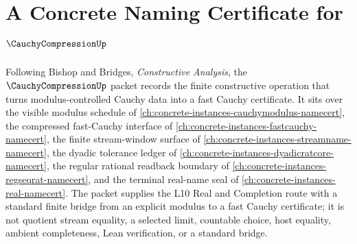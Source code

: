 \chapter{A Concrete Naming Certificate for $\CauchyCompressionUp$}
\label{ch:concrete-instances-cauchy-compression-namecert}

Following Bishop and Bridges, \emph{Constructive Analysis}, the $\CauchyCompressionUp$ packet records the finite constructive operation that turns modulus-controlled Cauchy data into a fast Cauchy certificate. It sits over the visible modulus schedule of \autoref{ch:concrete-instances-cauchymodulus-namecert}, the compressed fast-Cauchy interface of \autoref{ch:concrete-instances-fastcauchy-namecert}, the finite stream-window surface of \autoref{ch:concrete-instances-streamname-namecert}, the dyadic tolerance ledger of \autoref{ch:concrete-instances-dyadicratcore-namecert}, the regular rational readback boundary of \autoref{ch:concrete-instances-regseqrat-namecert}, and the terminal real-name seal of \autoref{ch:concrete-instances-real-namecert}. The packet supplies the L10 Real and Completion route with a standard finite bridge from an explicit modulus to a fast Cauchy certificate; it is not quotient stream equality, a selected limit, countable choice, host equality, ambient completeness, Lean verification, or a standard bridge.

